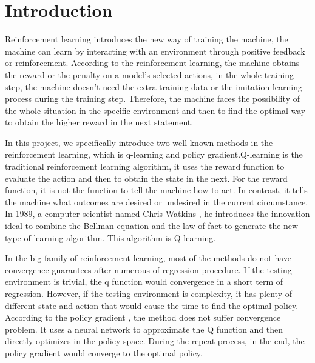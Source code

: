 \documentclass[article]{aaltoseries}
\begin{document}


\section{Introduction}

Reinforcement learning introduces the new way of training the machine, the machine can learn by interacting with an environment through positive feedback or reinforcement. According to the reinforcement learning, the machine obtains the reward or the penalty on a model’s selected actions, in the whole training step, the machine doesn’t need the extra training data or the imitation learning process during the training step. Therefore, the machine faces the possibility of the whole situation in the specific environment and then to find the optimal way to obtain the higher reward in the next statement.

In this project, we specifically introduce two well known methods in the reinforcement learning, which is q-learning and policy gradient.Q-learning is the traditional reinforcement learning algorithm, it uses the reward function to evaluate the action and then to obtain the state in the next. For the reward function, it is not the function to tell the machine how to act. In contrast, it tells the machine what outcomes are desired or undesired in the current circumstance. In 1989, a computer scientist named Chris Watkins \cite{Watkins1992}, he introduces the innovation ideal to combine the Bellman equation and the law of fact to generate the new type of learning algorithm. This algorithm is Q-learning.

In the big family of reinforcement learning, most of the methods do not have convergence guarantees after numerous of regression procedure. If the testing environment is trivial, the q function would convergence in a short term of regression. However, if the testing environment is complexity, it has plenty of different state and action that would cause the time to find the optimal policy. According to the policy gradient \cite{Sutton:1999:PGM:3009657.3009806}, the method does not suffer convergence problem. It uses a neural network to approximate the Q function and then directly optimizes in the policy space. During the repeat process, in the end, the policy gradient would converge to the optimal policy.
\end{document}

